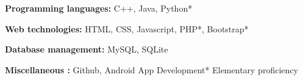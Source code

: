 \vspace{-7.2mm}


\begin{cventries}

  \cventry
    {} %
    {} %
    {} %
    {} %
    {\vspace{-8mm}
      \begin{cvitems} %
        \item {\bodyfont\textbf{\color{darkgray}Programming languages:} \small C++, Java, Python*}
        \item {\bodyfont\textbf{\color{darkgray}Web technologies:} \small  HTML, CSS, Javascript, PHP*, Bootstrap*}
        \item {\bodyfont\textbf{\color{darkgray}Database management:} \small MySQL, SQLite}
        \item {\bodyfont\textbf{\color{darkgray}Miscellaneous :} \small Github, Android App Development*}
        \newline\small * Elementary proficiency
      \end{cvitems}
    }

\end{cventries}